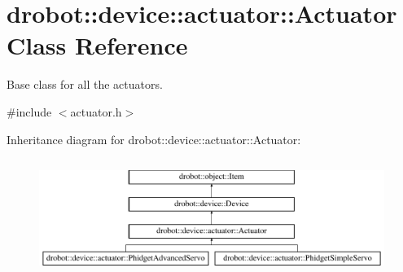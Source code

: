 \hypertarget{classdrobot_1_1device_1_1actuator_1_1Actuator}{\section{drobot\-:\-:device\-:\-:actuator\-:\-:Actuator Class Reference}
\label{classdrobot_1_1device_1_1actuator_1_1Actuator}
}


Base class for all the actuators.  




{\ttfamily \#include $<$actuator.\-h$>$}

Inheritance diagram for drobot\-:\-:device\-:\-:actuator\-:\-:Actuator\-:\begin{figure}[H]
\begin{center}
\leavevmode
\includegraphics[height=3.835616cm]{classdrobot_1_1device_1_1actuator_1_1Actuator}
\end{center}
\end{figure}

